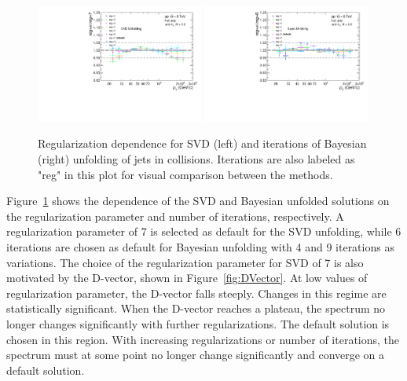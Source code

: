 \begin{figure}[hbt!]
    \centering
    \begin{multicols}{2}
            \includegraphics[width=0.49\textwidth]{figures/UnfoldingComparisons/Regularizations/RatioRegularizationSvd_R02.pdf}
        \vfill\null 
        \columnbreak
            \includegraphics[width=0.49\textwidth]{figures/UnfoldingComparisons/Regularizations/RatioRegularizationBayes_R02.pdf}
        \vfill\null
    \end{multicols}
    \caption{Regularization dependence for SVD (left) and iterations of Bayesian (right) unfolding of jets in \pp collisions. Iterations are also labeled as "reg" in this plot for visual comparison between the methods.}
    \label{fig:RegIter}
\end{figure}


Figure~\ref{fig:RegIter} shows the dependence of the SVD and Bayesian unfolded solutions on the regularization parameter and number of iterations, respectively. A regularization parameter of 7 is selected as default for the SVD unfolding, while 6 iterations are chosen as default for Bayesian unfolding with 4 and 9 iterations as variations. The choice of the regularization parameter for SVD of 7 is also motivated by the D-vector, shown in Figure~\ref{fig:DVector}. At low values of regularization parameter, the D-vector falls steeply. Changes in this regime are statistically significant. When the D-vector reaches a plateau, the spectrum no longer changes significantly with further regularizations. The default solution is chosen in this region. With increasing regularizations or number of iterations, the spectrum must at some point no longer change significantly and converge on a default solution.


